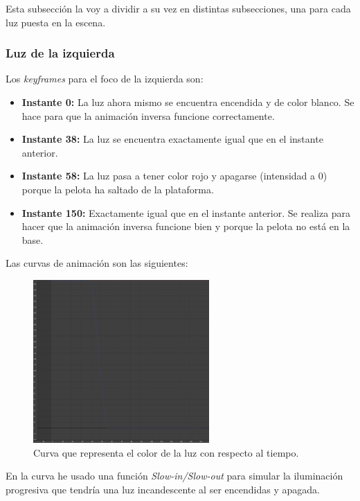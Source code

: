 \documentclass{article}
\begin{document}
\bigskip

Esta subsección la voy a dividir a su vez en distintas subsecciones, una para cada luz puesta en la escena.

\subsubsection{Luz de la izquierda}

Los \textit{keyframes} para el foco de la izquierda son:

\begin{itemize}
    \item \textbf{Instante 0: }La luz ahora mismo se encuentra encendida y de color blanco. Se hace para que la animación inversa funcione correctamente.
    \item \textbf{Instante 38: }La luz se encuentra exactamente igual que en el instante anterior.
    \item \textbf{Instante 58: }La luz pasa a tener color rojo y apagarse (intensidad a 0) porque la pelota ha saltado de la plataforma.
    \item \textbf{Instante 150: }Exactamente igual que en el instante anterior. Se realiza para hacer que la animación inversa funcione bien y porque la pelota no está en la base.
\end{itemize}

\newpage

Las curvas de animación son las siguientes:

\begin{figure}[H]
    \centering
    \includegraphics[width=0.6\textwidth]{imagenes/curvas/LL/filter.png}
    \caption{Curva que representa el color de la luz con respecto al tiempo.}
 \end{figure}

En la curva he usado una función \textit{Slow-in/Slow-out} para simular la iluminación progresiva que tendría una luz incandescente al ser encendidas y apagada.
\end{document}
